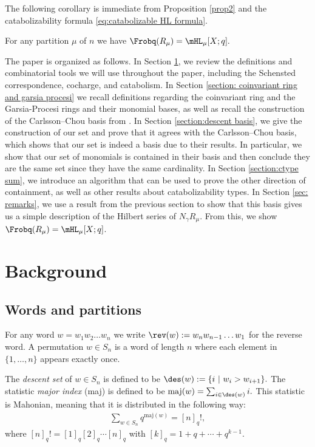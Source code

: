 The following corollary is immediate from Proposition \ref{prop2}  and the catabolizability formula \eqref{eq:catabolizable HL formula}.
\begin{cor3}
For any partition $\mu$ of $n$ we have $\Frobq(R_{\mu}) =\mHL_{\mu}[X;q].$
\end{cor3}

The paper is organized as follows. 
In Section \ref{section:background}, we review the definitions and  combinatorial tools we will use throughout the paper, including the Schensted correspondence, cocharge, and catabolism. 
In Section \ref{section: coinvariant ring and garsia procesi} we recall definitions regarding the coinvariant ring and the Garsia-Procesi rings and their monomial bases, as well as recall the construction of the Carlsson--Chou basis from \cite{CC}.
In Section \ref{section:descent basis}, we give the construction of our set and prove that it agrees with the Carlsson--Chou basis, which shows that our set is indeed a basis due to their results. In particular, we show that our set of monomials is contained in their basis and then conclude they are the same set since they have the same cardinality.
In Section \ref{section:ctype sum}, we introduce an algorithm that can be used to prove the other direction of containment, as well as other results about catabolizability types. 
In Section \ref{sec: remarks}, we use a result from the previous section to show that this basis gives us a simple description of the Hilbert series of $N_\gamma R_{\mu}$. From this, we show $\Frobq(R_{\mu})=\mHL_{\mu}[X;q]$.

\section{Background}\label{section:background}
\subsection{Words and partitions} \label{subsec: words and parts}
For any word $w =  w_1w_2\dots w_n$ we write  $\rev(w) := w_n w_{n-1}\dots w_1$ for the reverse word.  A permutation $w\in S_n$ is a word of length $n$ where each element in $\{1,\dots, n\}$ appears exactly once.

The \textit{descent set} of $w\in S_n$ is defined to be $\des (w) := \{i \ | \ w_i > w_{i+1}\}.$
The statistic \textit{major index} (maj) is defined to be
$\text{maj}(w) = \sum_{i \in \des(w)} i.$
This statistic is Mahonian, meaning that it is distributed in the following way:
\begin{align*}
  \sum\limits_{w\in S_n} q^{\text{maj}(w)} = [n]_q!,
\end{align*}
where $[n]_q! = [1]_q[2]_q\cdots [n]_q$ with $[k]_q = 1 + q+\cdots + q^{k-1}$.

